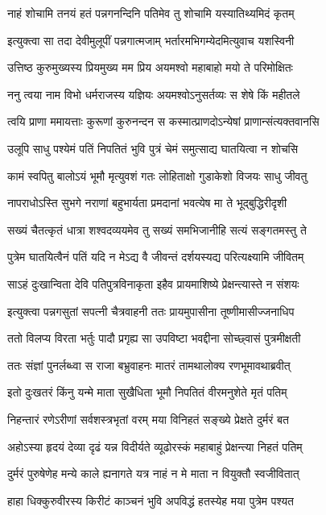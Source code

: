 \twolineshloka
{नाहं शोचामि तनयं हतं पन्नगनन्दिनि}
{पतिमेव तु शोचामि यस्यातिथ्यमिदं कृतम्}


\twolineshloka
{इत्युक्त्वा सा तदा देवीमुलूपीं पन्नगात्मजाम्}
{भर्तारमभिगम्येदमित्युवाच यशस्विनी}


\twolineshloka
{उत्तिष्ठ कुरुमुख्यस्य प्रियमुख्य मम प्रिय}
{अयमश्वो महाबाहो मयो ते परिमोक्षितः}


\twolineshloka
{ननु त्वया नाम विभो धर्मराजस्य यज्ञियः}
{अयमश्वोऽनुसर्तव्यः स शेषे किं महीतले}


\twolineshloka
{त्वयि प्राणा ममायत्ताः कुरूणां कुरुनन्दन}
{स कस्मात्प्राणदोऽन्येषां प्राणान्संत्यक्तवानसि}


\twolineshloka
{उलूपि साधु पश्येमं पतिं निपतितं भुवि}
{पुत्रं चेमं समुत्साद्य घातयित्वा न शोचसि}


\twolineshloka
{कामं स्वपितु बालोऽयं भूमौ मृत्युवशं गतः}
{लोहिताक्षो गुडाकेशो विजयः साधु जीवतु}


\twolineshloka
{नापराधोऽस्ति सुभगे नराणां बहुभार्यता}
{प्रमदानां भवत्येष मा ते भूद्बुद्धिरीदृशी}


\twolineshloka
{सख्यं चैतत्कृतं धात्रा शश्वदव्ययमेव तु}
{सख्यं समभिजानीहि सत्यं सङ्गतमस्तु ते}


\twolineshloka
{पुत्रेम घातयित्वैनं पतिं यदि न मेऽद्य वै}
{जीवन्तं दर्शयस्यद्य परित्यक्ष्यामि जीवितम्}


\twolineshloka
{साऽहं दुःखान्विता देवि पतिपुत्रविनाकृता}
{इहैव प्रायमाशिष्ये प्रेक्षन्त्यास्ते न संशयः}


\twolineshloka
{इत्युक्त्वा पन्नगसुतां सपत्नी चैत्रवाहनी}
{ततः प्रायमुपासीना तूष्णीमासीज्जनाधिप}


\twolineshloka
{ततो विलप्य विरता भर्तुः पादौ प्रगृह्य सा}
{उपविष्टा भवद्दीना सोच्छ्वासं पुत्रमीक्षती}


\twolineshloka
{ततः संज्ञां पुनर्लब्ध्वा स राजा बभ्रुवाहनः}
{मातरं तामथालोक्य रणभूमावथाब्रवीत्}


\twolineshloka
{इतो दुःखतरं किंनु यन्मे माता सुखैधिता}
{भूमौ निपतितं वीरमनुशेते मृतं पतिम्}


\twolineshloka
{निहन्तारं रणेऽरीणां सर्वशस्त्रभृतां वरम्}
{मया विनिहतं सङ्ख्ये प्रेक्षते दुर्मरं बत}


\twolineshloka
{अहोऽस्या हृदयं देव्या दृढं यन्न विदीर्यते}
{व्यूढोरस्कं महाबाहुं प्रेक्षन्त्या निहतं पतिम्}


\twolineshloka
{दुर्मरं पुरुषेणेह मन्ये काले ह्यनागते}
{यत्र नाहं न मे माता न वियुक्तौ स्वजीवितात्}


\twolineshloka
{हाहा धिक्कुरुवीरस्य किरीटं काञ्चनं भुवि}
{अपविद्धं हतस्येह मया पुत्रेम पश्यत}


